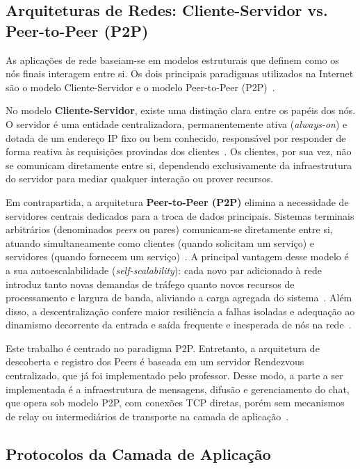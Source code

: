 \documentclass[12pt, a4paper]{article}
\begin{document}
\subsection{Arquiteturas de Redes: Cliente-Servidor vs. Peer-to-Peer (P2P)}

As aplicações de rede baseiam-se em modelos estruturais que definem como os nós finais interagem entre si. Os dois principais paradigmas utilizados na Internet são o modelo Cliente-Servidor e o modelo Peer-to-Peer (P2P)~\cite{kurose}.

No modelo \textbf{Cliente-Servidor}, existe uma distinção clara entre os papéis dos nós. O servidor é uma entidade centralizadora, permanentemente ativa (\textit{always-on}) e dotada de um endereço IP fixo ou bem conhecido, responsável por responder de forma reativa às requisições provindas dos clientes~\cite{kurose}. Os clientes, por sua vez, não se comunicam diretamente entre si, dependendo exclusivamente da infraestrutura do servidor para mediar qualquer interação ou prover recursos.

Em contrapartida, a arquitetura \textbf{Peer-to-Peer (P2P)} elimina a necessidade de servidores centrais dedicados para a troca de dados principais. Sistemas terminais arbitrários (denominados \textit{peers} ou pares) comunicam-se diretamente entre si, atuando simultaneamente como clientes (quando solicitam um serviço) e servidores (quando fornecem um serviço)~\cite{kurose}. A principal vantagem desse modelo é a sua autoescalabilidade (\textit{self-scalability}): cada novo par adicionado à rede introduz tanto novas demandas de tráfego quanto novos recursos de processamento e largura de banda, aliviando a carga agregada do sistema~\cite{kurose}. Além disso, a descentralização confere maior resiliência a falhas isoladas e adequação ao dinamismo decorrente da entrada e saída frequente e inesperada de nós na rede~\cite{pyp2p}.

Este trabalho é centrado no paradigma P2P. Entretanto, a arquitetura de descoberta e registro dos Peers é baseada em um servidor Rendezvous centralizado, que já foi implementado pelo professor. Desse modo, a parte a ser implementada é a infraestrutura de mensagens, difusão e gerenciamento do chat, que opera sob modelo P2P, com conexões TCP diretas, porém sem mecanismos de relay ou intermediários de transporte na camada de aplicação~\cite{pyp2p}.

\subsection{Protocolos da Camada de Aplicação}
\end{document}
